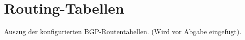 \chapter{Routing-Tabellen}

Auszug der konfigurierten BGP-Routentabellen. (Wird vor Abgabe eingefügt).